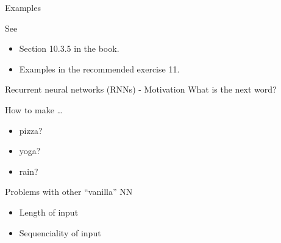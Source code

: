 \documentclass[
  10pt,
  ignorenonframetext,
  twocolumn]{beamer}
\providecommand{\tightlist}{%
  \setlength{\itemsep}{0pt}\setlength{\parskip}{0pt}}
\begin{document}
\begin{frame}
\begin{block}{Examples}
\label{examples}
\(~\)

See

\vspace{2mm}

\begin{itemize}
\tightlist
\item
  Section 10.3.5 in the book.
\end{itemize}

\vspace{2mm}

\begin{itemize}
\tightlist
\item
  Examples in the recommended exercise 11.
\end{itemize}
\end{block}
\end{frame}

\begin{frame}{Recurrent neural networks (RNNs) - Motivation}
\label{recurrent-neural-networks-rnns---motivation}
What is the next word?

\centering

How to make \ldots{}

\begin{itemize}
\tightlist
\item
  pizza?
\item
  yoga?
\item
  rain?
\end{itemize}
\end{frame}

\begin{frame}{Problems with other ``vanilla'' NN}
\label{problems-with-other-vanilla-nn}
\begin{itemize}
\tightlist
\item
  Length of input
\end{itemize}

\vspace{2mm}

\begin{itemize}
\tightlist
\item
  Sequenciality of input
\end{itemize}
\end{frame}
\end{document}
